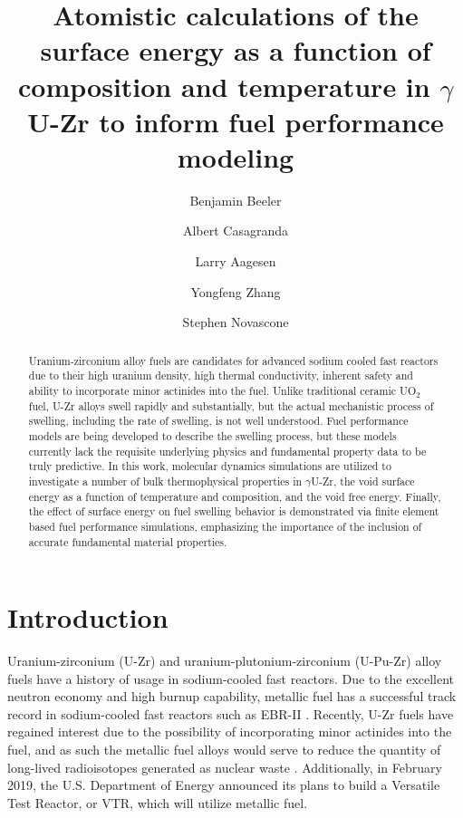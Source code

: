 \documentclass[review]{elsarticle}
\providecommand{\DIFdeltex}[1]{} %
\providecommand{\DIFdelbegin}{\protect\color{red}} %
\providecommand{\DIFdelend}{\protect\color{black}} %
\providecommand{\DIFdel}[1]{\texorpdfstring{\DIFdeltex{#1}}{}} %
\newcommand{\DIFscaledelfig}{0.5}
\newlength{\DIFdelgraphicswidth} %
\newlength{\DIFdelgraphicsheight} %
\newcommand{\DIFdelincludegraphics}[2][]{%
\sbox{\DIFdelgraphicsbox}{\DIFOincludegraphics[#1]{#2}}%
\settoboxwidth{\DIFdelgraphicswidth}{\DIFdelgraphicsbox} %
\settoboxtotalheight{\DIFdelgraphicsheight}{\DIFdelgraphicsbox} %
\scalebox{\DIFscaledelfig}{%
\parbox[b]{\DIFdelgraphicswidth}{\usebox{\DIFdelgraphicsbox}\\[-\baselineskip] \rule{\DIFdelgraphicswidth}{0em}}\llap{\resizebox{\DIFdelgraphicswidth}{\DIFdelgraphicsheight}{%
\setlength{\unitlength}{\DIFdelgraphicswidth}%
\begin{picture}(1,1)%
\thicklines\linethickness{2pt} %
{\color[rgb]{1,0,0}\put(0,0){\framebox(1,1){}}}%
{\color[rgb]{1,0,0}\put(0,0){\line( 1,1){1}}}%
{\color[rgb]{1,0,0}\put(0,1){\line(1,-1){1}}}%
\end{picture}%
}\hspace*{3pt}}} %
} %
\DeclareRobustCommand{\DIFdelbegin}{\DIFOdelbegin \let\includegraphics\DIFdelincludegraphics} %
\DeclareRobustCommand{\DIFdelend}{\DIFOaddend \let\includegraphics\DIFOincludegraphics} %
\begin{document}
\begin{frontmatter}
\title{Atomistic calculations of the surface energy as a function of composition and temperature in $\gamma$ U-Zr to inform fuel performance modeling}


\author[inl,ncsu]{Benjamin Beeler}
\author[inl]{Albert Casagranda}
\author[inl]{Larry Aagesen}
\author[inl,wisc]{Yongfeng Zhang}
\author[inl]{Stephen Novascone}
\address[inl]{Idaho National Laboratory, Idaho Falls, ID 83415}
\address[ncsu]{North Carolina State University, Raleigh, NC 27607}
\address[wisc]{University of Wisconsin-Madison, Madison, WI 53706}



\begin{abstract}

Uranium-zirconium alloy fuels are candidates for advanced sodium cooled fast reactors \DIFdelbegin \DIFdel{, }\DIFdelend due to their high uranium density, high thermal conductivity, inherent safety and ability to incorporate minor actinides into the fuel. Unlike traditional ceramic UO$_2$ fuel, U-Zr alloys swell rapidly and substantially, but the actual mechanistic process of swelling, including the rate of swelling, is not well understood. Fuel performance models are being developed to describe the swelling process, but these models currently lack the requisite underlying physics and fundamental property data to be truly predictive. In this work, molecular dynamics simulations are utilized to investigate a number of bulk thermophysical properties in  $\gamma$U-Zr, the void surface energy as a function of temperature and composition, and the void free energy. Finally, the effect of surface energy on fuel swelling behavior is demonstrated via finite element based fuel performance simulations, emphasizing the importance of the inclusion of accurate fundamental material properties. 


\end{abstract}
\end{frontmatter}

\linenumbers
\modulolinenumbers[5]

\section{Introduction}

Uranium-zirconium (U-Zr) and uranium-plutonium-zirconium (U-Pu-Zr) alloy fuels have a history of usage in sodium-cooled fast reactors. Due to the excellent neutron economy and high burnup capability, metallic fuel has a successful track record in sodium-cooled fast reactors such as EBR-II \cite{hofman1997}. Recently, U-Zr fuels have regained interest due to the possibility of incorporating minor actinides into the fuel, and as such the metallic fuel alloys would serve to reduce the quantity of long-lived radioisotopes generated as nuclear waste \cite{capriotti2017}. Additionally, in February 2019, the U.S. Department of Energy announced its plans to build a Versatile Test Reactor, or VTR, which will utilize metallic fuel. 
\end{document}
